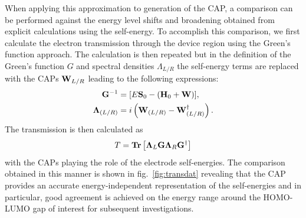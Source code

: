 When applying this approximation to generation of the \ac{CAP}, a
comparison can be performed against the energy level shifts and broadening
obtained from explicit calculations using the self-energy. To accomplish
this comparison, we first calculate the electron transmission through
the device region using the Green's function
approach. The calculation is then repeated but in the definition of the
Green's function $G$ and spectral densities $\Lambda_{L/R}$ the
self-energy terms are replaced with the \acp{CAP} $\mathbf{W}_{L/R}$ leading
to the following expressions:
\begin{subequations}
  \begin{align}
	  \mathbf{G}^{-1} &= [E\mathbf{S}_0 - (\mathbf{H}_0 + \mathbf{W})], \\
	  \mathbf{\Lambda}_{(L/R)} &= i \left( \mathbf{W}_{(L/R)} - \mathbf{W}^\dagger_{(L/R)}
    \right).
  \end{align}
  \label{eq:glambdadef}
\end{subequations}
The transmission is then calculated as
\begin{equation}
  T = \mathbf{Tr} \left[ \mathbf{\Lambda}_L \mathbf{G} \mathbf{\Lambda}_R \mathbf{G}^\dagger \right]
  \label{eq:transmfromG}
\end{equation}
with the \acp{CAP} playing the role of the electrode self-energies.
The comparison obtained in this manner is shown in
fig.~\ref{fig:transdat} revealing that the \ac{CAP} provides an
accurate energy-independent representation of the self-energies and in
particular, good agreement is achieved on the energy range around the
\ac{HOMO}-\ac{LUMO} gap of interest for subsequent investigations.

